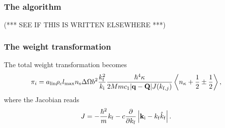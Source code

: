 \subsubsection{The algorithm}
(*** SEE IF THIS IS WRITTEN ELSEWHERE ***)

\subsubsection{The weight transformation}
The total weight transformation becomes
\begin{equation} \label{eq:phonon_mult}
\pi_i = a_{\rm lin} \rho_c l_{\rm max} n_{\rm s} \Delta \Omega
 b^2 \frac{k_{\rm f}^2}{k_{\rm i}}
 \frac{\hbar^4 \kappa}{2Mm c_1 |{\bf q}-{\bf Q}| J(k_{{\rm f},j})} 
 \left\langle n_{\kappa}+\frac12\pm\frac12 \right\rangle ,
\end{equation}
where the Jacobian reads
\begin{equation}
J = -\frac{\hbar^2}{m} k_{\rm f} 
    - c \frac{\partial}{\partial k_{\rm f}} 
        \left| {\bf k}_{\rm i} - k_{\rm f} \hat{k}_{\rm f} \right| .
\end{equation}

